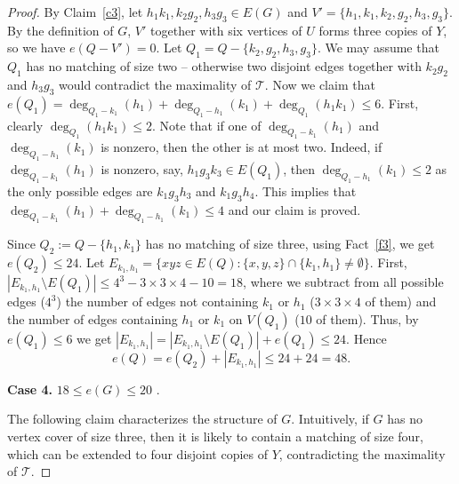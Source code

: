 \documentclass[11pt, reqno]{amsart}    	%
\theoremstyle{definition}
\def\cT{\mathcal T}
\numberwithin{equation}{section}
\begin{document}
\begin{proof}
		By Claim~\ref{c3}, let $h_1k_1,k_2g_2,h_3g_3\in E(G)$ and $ V'=\{h_1,k_1,k_2,g_2,h_3,g_3\} $. 
		By the definition of $G$, $ V' $ together with six vertices of $U$ forms three copies of $Y$, so we have $ e(Q-V')=0 $. 
		Let $Q_1=Q-\{k_2,g_2,h_3,g_3\}$.
		We may assume that $Q_1$ has no matching of size two -- otherwise two disjoint edges together with $k_2g_2$ and $h_3g_3$ would contradict the maximality of $\cT$.
		Now we claim that $e(Q_1)=\deg_{Q_1-k_1}(h_1)+\deg_{Q_1-h_1}(k_1) + \deg_{Q_1}(h_1k_1)\le6$. 
		First, clearly $\deg_{Q_1}(h_1k_1)\le2$.
		Note that if one of $\deg_{Q_1-k_1}(h_1)$ and $\deg_{Q_1-h_1}(k_1)$ is nonzero, then the other is at most two.
		Indeed, if $\deg_{Q_1-k_1}(h_1)$ is nonzero, say, $h_1g_3k_3\in E(Q_1)$, then $\deg_{Q_1-h_1}(k_1)\le 2$ as the only possible edges are $k_1g_3h_3$ and $k_1g_3h_4$.
		This implies that $\deg_{Q_1-k_1}(h_1)+\deg_{Q_1-h_1}(k_1)\le 4$ and our claim is proved.
		
		Since $Q_{2}:=Q-\{h_1,k_1\}$ has no matching of size  three, using Fact~\ref{f3}, we get $e(Q_2)\le24.$ Let $ E_{k_1, h_1} =\{xyz\in E(Q):\{x,y,z\}\cap\{k_1,h_1\}\not= \emptyset\}$. 
		First, $|E_{k_1, h_1}\setminus E(Q_1)|\le 4^3-3\times3\times4-10=18$, where we subtract from all possible edges ($4^3$) the number of edges not containing $k_1$ or $h_1$ ($3\times3\times4$ of them) and the number of edges containing $ h_1$ or $k_1 $ on $ V(Q_1)  $ ($10$ of them). %
		Thus, by $e(Q_1)\le6$ we get $ |E_{k_1,h_1}|= |E_{k_1, h_1}\setminus E(Q_1)| + e(Q_1)\le 24$. Hence
		\[
		e(Q)= e(Q_2)+|E_{k_1,h_1}|\le 24+24=48.
		\]
		
		
		
		
		\textbf{Case 4.} $ 18\le e(G)\le20$ . 
		
		The following claim characterizes the structure of $G$. Intuitively, if $G$ has no vertex cover of size three, then it is likely to contain a matching of size four, which can be extended to four disjoint copies of $Y$, contradicting the maximality of $\cT$.
		

\end{proof}
\end{document}
